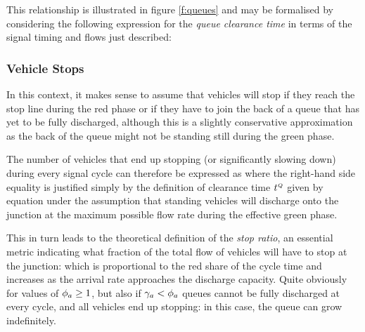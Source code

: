 This relationship is illustrated in figure \ref{f:queues} and may be formalised by considering the following expression for the \emph{queue clearance time} in terms of the signal timing and flows just described:

\subsubsection*{Vehicle Stops}
In this context, it makes sense to assume that vehicles will stop if they reach the stop line during the red phase or if they have to join the back of a queue that has yet to be fully discharged, although this is a slightly conservative approximation as the back of the queue might not be standing still during the green phase.

The number of vehicles that end up stopping (or significantly slowing down) during every signal cycle can therefore be expressed as
where the right-hand side equality is justified simply by the definition of clearance time $t_{}^{\scriptscriptstyle{Q}}$ given by equation  under the assumption that standing vehicles will discharge onto the junction at the maximum possible flow rate during the effective green phase. 

This in turn leads to the theoretical definition of the \emph{stop ratio}, an essential metric indicating what fraction of the total flow of vehicles will have to stop at the junction:
which is proportional to the red share of the cycle time and increases as the arrival rate approaches the discharge capacity.
Quite obviously for values of $\phi_a \geq 1$, but also if $\gamma_{a} < \phi_a$ queues cannot be fully discharged at every cycle, and all vehicles end up stopping: in this case, the queue can grow indefinitely.


